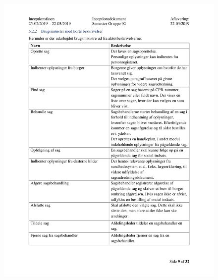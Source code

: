 \begin{figure}[hb]
  \includegraphics[scale = 0.33]{./PNG/Inceptions/Gruppe 02 + InceptionsDokument-10.jpg} 
\end{figure}

